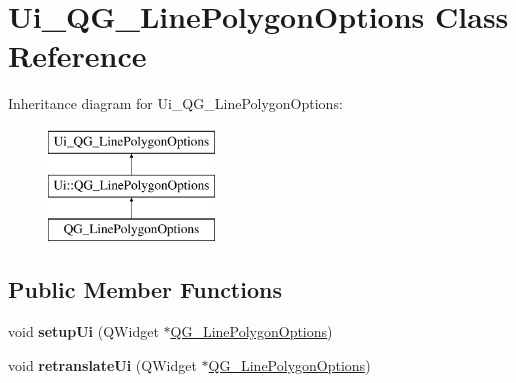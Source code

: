 \hypertarget{classUi__QG__LinePolygonOptions}{\section{Ui\-\_\-\-Q\-G\-\_\-\-Line\-Polygon\-Options Class Reference}
\label{classUi__QG__LinePolygonOptions}
}
Inheritance diagram for Ui\-\_\-\-Q\-G\-\_\-\-Line\-Polygon\-Options\-:\begin{figure}[H]
\begin{center}
\leavevmode
\includegraphics[height=3.000000cm]{classUi__QG__LinePolygonOptions}
\end{center}
\end{figure}
\subsection*{Public Member Functions}
\begin{DoxyCompactItemize}
\item 
\hypertarget{classUi__QG__LinePolygonOptions_a0b4ada75ce1a7740ea82c0d0fb53d5df}{void {\bfseries setup\-Ui} (Q\-Widget $\ast$\hyperlink{classQG__LinePolygonOptions}{Q\-G\-\_\-\-Line\-Polygon\-Options})}\label{classUi__QG__LinePolygonOptions_a0b4ada75ce1a7740ea82c0d0fb53d5df}

\item 
\hypertarget{classUi__QG__LinePolygonOptions_a5465b432d0ca56ac561d8b2466843be0}{void {\bfseries retranslate\-Ui} (Q\-Widget $\ast$\hyperlink{classQG__LinePolygonOptions}{Q\-G\-\_\-\-Line\-Polygon\-Options})}\label{classUi__QG__LinePolygonOptions_a5465b432d0ca56ac561d8b2466843be0}

\end{DoxyCompactItemize}
